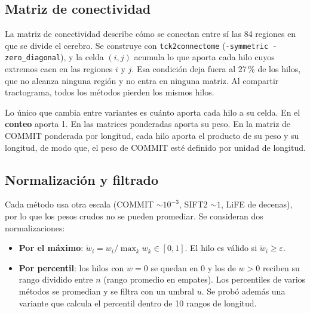 \documentclass[11pt,a4paper]{article}
\newcommand{\code}[1]{\texttt{\small #1}}
\newcommand{\eps}{\varepsilon}
\begin{document}
\subsection{Matriz de conectividad}

La matriz de conectividad describe c\'omo se conectan entre s\'i las 84 regiones en que se
divide el cerebro. Se construye con \code{tck2connectome} (\code{-symmetric
-zero\_diagonal}), y la celda $(i,j)$ acumula lo que aporta cada hilo cuyos extremos caen
en las regiones $i$ y $j$. Esa condici\'on deja fuera al 27\,\% de los hilos, que no
alcanza ninguna regi\'on y no entra en ninguna matriz. Al compartir tractograma, todos los
m\'etodos pierden los mismos hilos.

Lo \'unico que cambia entre variantes es cu\'anto aporta cada hilo a su celda. En el \textbf{conteo} aporta 1. En las matrices ponderadas aporta su peso. En la matriz de COMMIT ponderada por longitud, cada hilo aporta el producto de su peso y su longitud, de modo que, el peso de COMMIT esté definido por unidad de longitud.


\subsection{Normalizaci\'on y filtrado}
\label{sec:norm}

Cada m\'etodo usa otra escala (COMMIT $\sim10^{-3}$, SIFT2 $\sim1$, LiFE de decenas), por
lo que los pesos crudos no se pueden promediar. Se consideran dos normalizaciones:
\begin{itemize}
  \item \textbf{Por el m\'aximo}: $\tilde w_i = w_i/\max_k w_k\in[0,1]$.
        El hilo es v\'alido si $\tilde w_i\ge\eps$.
  \item \textbf{Por percentil}: los hilos con $w=0$ se quedan en 0 y
        los de $w>0$ reciben su rango dividido entre $n$ (rango promedio en empates).
        Los percentiles de varios m\'etodos se promedian y se filtra con un umbral $u$.
        Se prob\'o adem\'as una variante que calcula el percentil dentro de 10 rangos de longitud.
\end{itemize}
\end{document}
